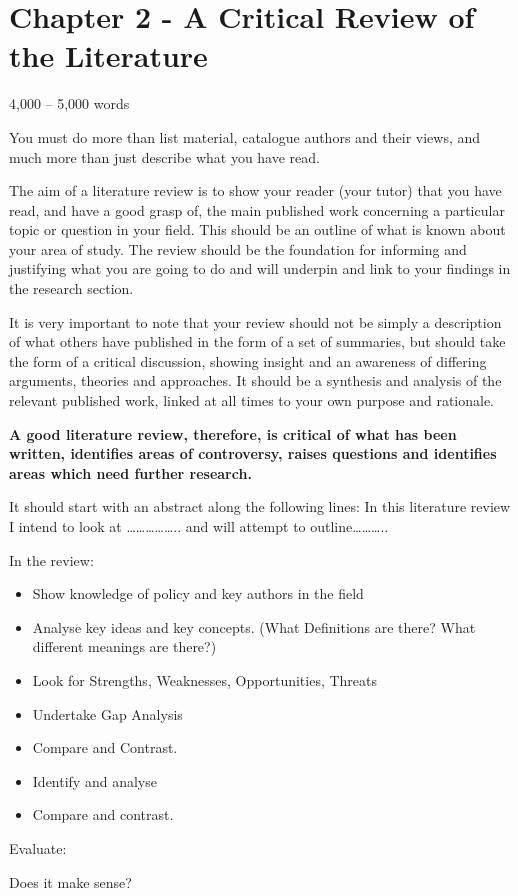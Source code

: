 \section{Chapter 2 - A Critical Review of the Literature}
4,000 – 5,000 words

You must do more than list material, catalogue authors and their views, and much more than just describe what you have read. 

The aim of a literature review is to show your reader (your tutor) that you have read, and have a good grasp of, the main published work concerning a particular topic or question in your field. This should be an outline of what is known about your area of study.  The review should be the foundation for informing and justifying what you are going to do and will underpin and link to your findings in the research section.

It is very important to note that your review should not be simply a description of what others have published in the form of a set of summaries, but should take the form of a critical discussion, showing insight and an awareness of differing arguments, theories and approaches. It should be a synthesis and analysis of the relevant published work, linked at all times to your own purpose and rationale.

\textbf{A good literature review, therefore, is critical of what has been written, identifies areas of controversy, raises questions and identifies areas which need further research. }

It should start with an abstract along the following lines:
In this literature review I intend to look at …………….. and will attempt to outline………..

In the review:
\begin{itemize}
\item{Show knowledge of policy and key authors in the field}
\item{Analyse key ideas and key concepts. (What Definitions are there? What different meanings are there?)}
\item{Look for Strengths, Weaknesses, Opportunities, Threats}
\item{Undertake Gap Analysis}
\item{Compare and Contrast. }
\item{Identify and analyse }
\item{Compare and contrast.}
\end{itemize}
Evaluate: 

Does it make sense? 

